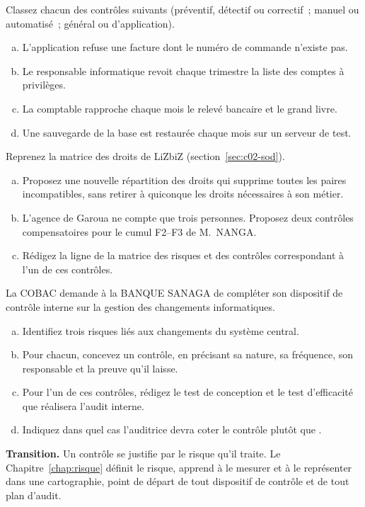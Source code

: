 \bigskip

\begin{boxexo}[title={\ding{45}\quad Exercice~2.1. Classer des contrôles \niveaubase}]
Classez chacun des contrôles suivants (préventif, détectif ou correctif~;
manuel ou automatisé~; général ou d'application).
\begin{enumerate}[(a)]
    \item L'application refuse une facture dont le numéro de commande
          n'existe pas.
    \item Le responsable informatique revoit chaque trimestre la liste des
          comptes à privilèges.
    \item La comptable rapproche chaque mois le relevé bancaire et le grand
          livre.
    \item Une sauvegarde de la base est restaurée chaque mois sur un serveur
          de test.
\end{enumerate}
\end{boxexo}

\begin{boxexo}[title={\ding{45}\quad Exercice~2.2. Corriger la matrice des droits \niveaumoyen}]
Reprenez la matrice des droits de LiZbiZ (section~\ref{sec:c02-sod}).
\begin{enumerate}[(a)]
    \item Proposez une nouvelle répartition des droits qui supprime toutes
          les paires incompatibles, sans retirer à quiconque les droits
          nécessaires à son métier.
    \item L'agence de Garoua ne compte que trois personnes. Proposez deux
          contrôles compensatoires pour le cumul F2--F3 de M.~NANGA.
    \item Rédigez la ligne de la matrice des risques et des contrôles
          correspondant à l'un de ces contrôles.
\end{enumerate}
\end{boxexo}

\begin{boxexo}[title={\ding{45}\quad Exercice~2.3. Le dispositif de la BANQUE SANAGA \niveauexpert}]
La COBAC demande à la BANQUE SANAGA de compléter son dispositif de contrôle
interne sur la gestion des changements informatiques.
\begin{enumerate}[(a)]
    \item Identifiez trois risques liés aux changements du système central.
    \item Pour chacun, concevez un contrôle, en précisant sa nature, sa
          fréquence, son responsable et la preuve qu'il laisse.
    \item Pour l'un de ces contrôles, rédigez le test de conception et le
          test d'efficacité que réalisera l'audit interne.
    \item Indiquez dans quel cas l'auditrice devra coter le contrôle \NEK{}
          plutôt que \NON{}.
\end{enumerate}
\end{boxexo}

\bigskip

\begin{boxinfo}
\textbf{Transition.} Un contrôle se justifie par le risque qu'il traite. Le
Chapitre~\ref{chap:risque} définit le risque, apprend à le mesurer et à le
représenter dans une cartographie, point de départ de tout dispositif de
contrôle et de tout plan d'audit.
\end{boxinfo}
